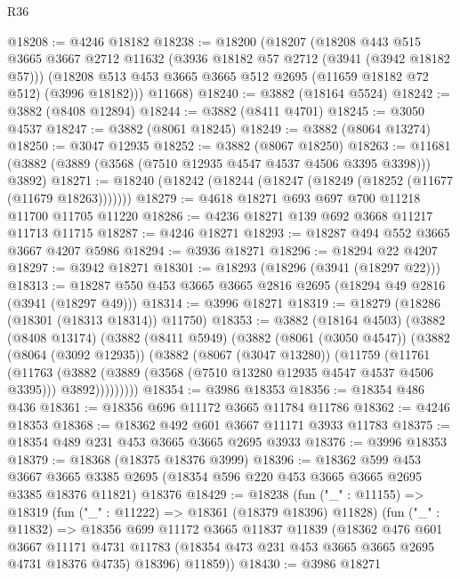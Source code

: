 \begin{lexlean}{R36}
\begin{coremodule}
@18208 := @4246 @18182
@18238 := @18200
    (@18207
      (@18208
        @443
        @515
        @3665
        @3667
        @2712
        @11632
        (@3936 @18182 @57 @2712 (@3941 (@3942 @18182 @57)))
        (@18208 @513 @453 @3665 @3665 @512 @2695 (@11659 @18182 @72 @512) (@3996 @18182)))
      @11668)
@18240 := @3882 (@18164 @5524)
@18242 := @3882 (@8408 @12894)
@18244 := @3882 (@8411 @4701)
@18245 := @3050 @4537
@18247 := @3882 (@8061 @18245)
@18249 := @3882 (@8064 @13274)
@18250 := @3047 @12935
@18252 := @3882 (@8067 @18250)
@18263 := @11681 (@3882 (@3889 (@3568 (@7510 @12935 @4547 @4537 @4506 @3395 @3398))) @3892)
@18271 := @18240 (@18242 (@18244 (@18247 (@18249 (@18252 (@11677 (@11679 @18263)))))))
@18279 := @4618 @18271 @693 @697 @700 @11218 @11700 @11705 @11220
@18286 := @4236 @18271 @139 @692 @3668 @11217 @11713 @11715
@18287 := @4246 @18271
@18293 := @18287 @494 @552 @3665 @3667 @4207 @5986
@18294 := @3936 @18271
@18296 := @18294 @22 @4207
@18297 := @3942 @18271
@18301 := @18293 (@18296 (@3941 (@18297 @22)))
@18313 := @18287 @550 @453 @3665 @3665 @2816 @2695 (@18294 @49 @2816 (@3941 (@18297 @49)))
@18314 := @3996 @18271
@18319 := @18279 (@18286 (@18301 (@18313 @18314)) @11750)
@18353 := @3882
    (@18164 @4503)
    (@3882
      (@8408 @13174)
      (@3882
        (@8411 @5949)
        (@3882
          (@8061 (@3050 @4547))
          (@3882
            (@8064 (@3092 @12935))
            (@3882
              (@8067 (@3047 @13280))
              (@11759
                (@11761
                  (@11763
                    (@3882
                      (@3889 (@3568 (@7510 @13280 @12935 @4547 @4537 @4506 @3395)))
                      @3892)))))))))
@18354 := @3986 @18353
@18356 := @18354 @486 @436
@18361 := @18356 @696 @11172 @3665 @11784 @11786
@18362 := @4246 @18353
@18368 := @18362 @492 @601 @3667 @11171 @3933 @11783
@18375 := @18354 @489 @231 @453 @3665 @3665 @2695 @3933
@18376 := @3996 @18353
@18379 := @18368 (@18375 @18376 @3999)
@18396 := @18362
    @599
    @453
    @3667
    @3665
    @3385
    @2695
    (@18354 @596 @220 @453 @3665 @3665 @2695 @3385 @18376 @11821)
    @18376
@18429 := @18238
    (fun ("_" : @11155) =>
    @18319
      (fun ("_" : @11222) => @18361 (@18379 @18396) @11828)
      (fun ("_" : @11832) =>
      @18356
        @699
        @11172
        @3665
        @11837
        @11839
        (@18362
          @476
          @601
          @3667
          @11171
          @4731
          @11783
          (@18354 @473 @231 @453 @3665 @3665 @2695 @4731 @18376 @4735)
          @18396)
        @11859))
@18430 := @3986 @18271

\end{coremodule}
\end{lexlean}
